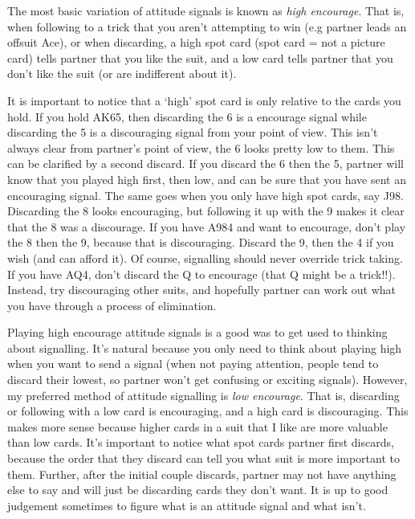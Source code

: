 \documentclass[a4paper]{JoshCards}
\begin{document}
The most basic variation of attitude signals is known as \textit{high encourage}. That is, when following to a trick that you aren't attempting to win (e.g partner leads an offsuit Ace), or when discarding, a high spot card (spot card = not a picture card) tells partner that you like the suit, and a low card tells partner that you don't like the suit (or are indifferent about it). 


It is important to notice that a `high' spot card is only relative to the cards you hold. If you hold AK65, then discarding the 6 is a encourage signal while discarding the 5 is a discouraging signal from your point of view. This isn't always clear from partner's point of view, the 6 looks pretty low to them. This can be clarified by a second discard. If you discard the 6 then the 5, partner will know that you played high first, then low, and can be sure that you have sent an encouraging signal. The same goes when you only have high spot cards, say J98. Discarding the 8 looks encouraging, but following it up with the 9 makes it clear that the 8 was a discourage. If you have A984 and want to encourage, don't play the 8 then the 9, because that is discouraging. Discard the 9, then the 4 if you wish (and can afford it). Of course, signalling should never override trick taking. If you have AQ4, don't discard the Q to encourage (that Q might be a trick!!). Instead, try discouraging other suits, and hopefully partner can work out what you have through a process of elimination.

Playing high encourage attitude signals is a good was to get used to thinking about signalling. It's natural because you only need to think about playing high when you want to send a signal (when not paying attention, people tend to discard their lowest, so partner won't get confusing or exciting signals). However, my preferred method of attitude signalling is \textit{low encourage}. That is, discarding or following with a low card is encouraging, and a high card is discouraging. This makes more sense because higher cards in a suit that I like are more valuable than low cards. It's important to notice what spot cards partner first discards, because the order that they discard can tell you what suit is more important to them. Further, after the initial couple discards, partner may not have anything else to say and will just be discarding cards they don't want. It is up to good judgement sometimes to figure what is an attitude signal and what isn't.
\end{document}

